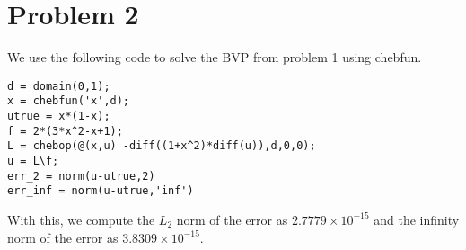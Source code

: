 \documentclass{article}
\begin{document}
\section{Problem 2}
We use the following code to solve the BVP from problem 1 using chebfun. 
\begin{verbatim}
d = domain(0,1);
x = chebfun('x',d);
utrue = x*(1-x);
f = 2*(3*x^2-x+1);
L = chebop(@(x,u) -diff((1+x^2)*diff(u)),d,0,0);
u = L\f;
err_2 = norm(u-utrue,2)
err_inf = norm(u-utrue,'inf')
\end{verbatim}
With this, we compute the $L_2$ norm of the error as $2.7779\times10^{-15}$ and the infinity norm of the error as $3.8309\times10^{-15}$.
\end{document}
